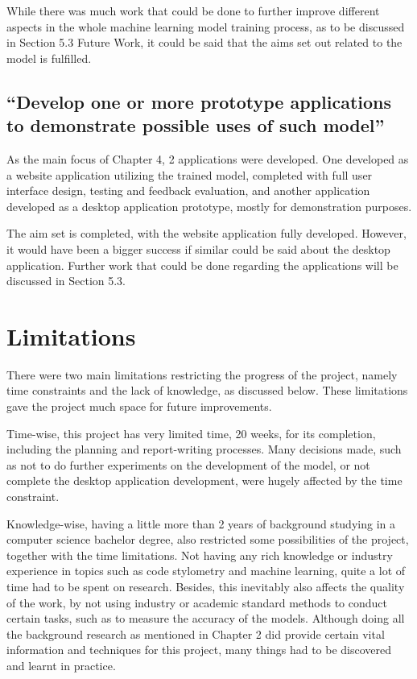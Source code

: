 \documentclass{report}
\begin{document}
While there was much work that could be done to further improve different aspects in the whole machine learning model training process, as to be discussed in Section 5.3 Future Work, it could be said that the aims set out related to the model is fulfilled.

\subsection{“Develop one or more prototype applications to demonstrate possible uses of such model”}

As the main focus of Chapter 4, 2 applications were developed. One developed as a website application utilizing the trained model, completed with full user interface design, testing and feedback evaluation, and another application developed as a desktop application prototype, mostly for demonstration purposes.

The aim set is completed, with the website application fully developed. However, it would have been a bigger success if similar could be said about the desktop application. Further work that could be done regarding the applications will be discussed in Section 5.3.

\section{Limitations}

There were two main limitations restricting the progress of the project, namely time constraints and the lack of knowledge, as discussed below. These limitations gave the project much space for future improvements.

Time-wise, this project has very limited time, 20 weeks, for its completion, including the planning and report-writing processes. Many decisions made, such as not to do further experiments on the development of the model, or not complete the desktop application development, were hugely affected by the time constraint.

Knowledge-wise, having a little more than 2 years of background studying in a computer science bachelor degree, also restricted some possibilities of the project, together with the time limitations. Not having any rich knowledge or industry experience in topics such as code stylometry and machine learning, quite a lot of time had to be spent on research. Besides, this inevitably also affects the quality of the work, by not using industry or academic standard methods to conduct certain tasks, such as to measure the accuracy of the models. Although doing all the background research as mentioned in Chapter 2 did provide certain vital information and techniques for this project, many things had to be discovered and learnt in practice.
\end{document}
